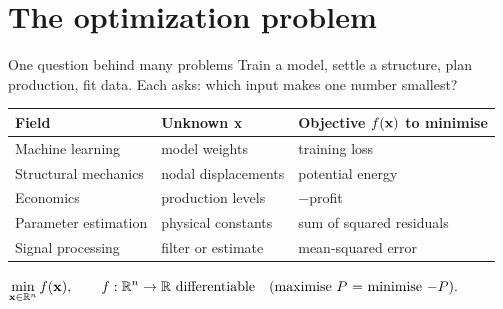 \section{The optimization problem}

\begin{frame}{One question behind many problems}
  Train a model, settle a structure, plan production, fit data. Each asks: \alert{which input makes one number smallest?}

  \centering\small
  \begin{tabular}{@{}l l l@{}}
    \toprule
    Field & Unknown $\mathbf{x}$ & Objective $f(\mathbf{x})$ to minimise \\
    \midrule
    Machine learning & model weights & training loss \\
    Structural mechanics & nodal displacements & potential energy \\
    Economics & production levels & $-$profit \\
    Parameter estimation & physical constants & sum of squared residuals \\
    Signal processing & filter or estimate & mean-squared error \\
    \bottomrule
  \end{tabular}

  \raggedright
  \begin{keybox}
    \centering $\displaystyle \min_{\mathbf{x}\in\mathbb{R}^n} f(\mathbf{x}), \qquad f:\mathbb{R}^n\to\mathbb{R} \text{ differentiable}\quad\text{(maximise $P$ = minimise $-P$).}$
  \end{keybox}
\end{frame}

